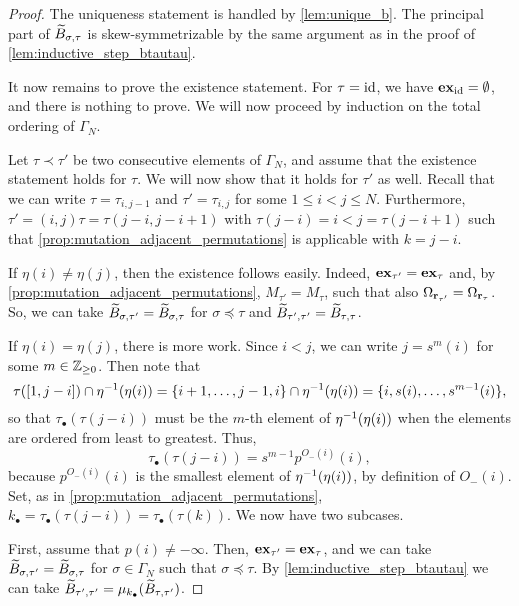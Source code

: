 \begin{proof}
	The uniqueness statement is handled by \cref{lem:unique_b}. The principal part of $\widetilde{B}_{\sigma, \tau}$ is skew-symmetrizable by the same argument as in the proof of \cref{lem:inductive_step_btautau}.

	It now remains to prove the existence statement. For $\tau = \operatorname{id}$, we have $\mathbf{ex}_{\operatorname{id}} =
		\emptyset$, and there is nothing to prove. We will now proceed by induction on the
	total ordering of $\Gamma_N$.

	Let $\tau \prec \tau'$ be two consecutive elements of $\Gamma_N$, and assume that the
	existence statement holds for $\tau$. We will now show that it holds for $\tau'$ as
	well. Recall that we can write $\tau = \tau_{i, j-1}$ and $\tau' = \tau_{i, j}$ for
	some $1 \leq i < j \leq N$. Furthermore, $\tau' = (i, j)\tau = \tau(j-i, j-i+1)$ with
	$\tau(j-i) = i < j = \tau(j - i +1)$ such that
	\cref{prop:mutation_adjacent_permutations} is applicable with $k = j - i$.

	If $\eta(i) \neq \eta(j)$, then the existence follows easily. Indeed, $\mathbf{ex}_{\tau'} =
		\mathbf{ex}_\tau$ and, by \cref{prop:mutation_adjacent_permutations}, $M_{\tau'} = M_\tau$,
	such that also $\Omega_{\mathbf{r}_{\tau'}} = \Omega_{\mathbf{r}_\tau}$. So, we can take
	$\widetilde{B}_{\sigma, \tau'} = \widetilde{B}_{\sigma, \tau}$ for $\sigma \preceq \tau$ and $\widetilde{B}_{\tau',
			\tau'} = \widetilde{B}_{\tau, \tau}$.

	If $\eta(i) = \eta(j)$, there is more work. Since $i < j$, we can write $j = s^m(i)$
	for some $m \in \mathbb{Z}_{\geq 0}$. Then note that
	\begin{equation*}
		\tau([1, j-i]) \cap \eta^{-1}(\eta(i)) = \{i+1, \dots, j-1, i\} \cap \eta^{-1}(\eta(i))= \{i, s(i), \dots, s^{m- 1}(i)\},
	\end{equation*}
	so that $\tau_\bullet(\tau(j-i))$ must be the $m$-th element of $\eta^{-1}(\eta(i))$
	when the elements are ordered from least to greatest. Thus,
	\begin{equation*}
		\tau_\bullet (\tau(j- i)) = s^{m-1}p^{O_{-}(i)}(i),
	\end{equation*}
	because $p^{O_{-}(i)}(i)$ is the smallest element of $\eta^{-1}(\eta(i))$, by definition of $O_{-}(i)$. Set, as in \cref{prop:mutation_adjacent_permutations}, $k_\bullet = \tau_\bullet(\tau(j-i)) = \tau_\bullet(\tau(k))$. We now have two subcases.

	First, assume that $p(i) \neq -\infty$. Then, $\mathbf{ex}_{\tau'} = \mathbf{ex}_{\tau}$, and we can
	take $\widetilde{B}_{\sigma, \tau'} = \widetilde{B}_{\sigma, \tau}$ for $\sigma \in \Gamma_N$ such that
	$\sigma \preceq \tau$. By \cref{lem:inductive_step_btautau} we can take $\widetilde{B}_{\tau',
			\tau'} = \mu_{k_\bullet}(\widetilde{B}_{\tau, \tau'})$.


\end{proof}

